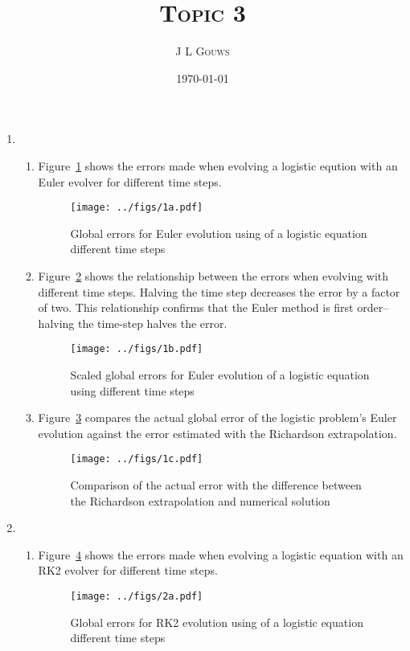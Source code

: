 \documentclass[12pt,a4]{article}
\title{
\textsc{Topic 3}
}
\author{\textsc{J L Gouws}
}
\date{\today
\\[1cm]}
\begin{document}
\thispagestyle{empty}

\maketitle

\begin{enumerate}
  \item
    \begin{enumerate}
      \item
        Figure~\ref{fig:1a} shows the errors made when evolving a logistic eqution with an Euler evolver for different time steps.
        \begin{figure}[H]
          \centering
          \texttt{[image: ../figs/1a.pdf]} 
          \caption{Global errors for Euler evolution using of a logistic equation different time steps}
          \label{fig:1a}
        \end{figure}

      \item
        Figure~\ref{fig:1b} shows the relationship between the errors when evolving with different time steps.
        Halving the time step decreases the error by a factor of two.
        This relationship confirms that the Euler method is first order--halving the time-step halves the error.

        \begin{figure}[H]
          \centering
          \texttt{[image: ../figs/1b.pdf]}
          \caption{Scaled global errors for Euler evolution of a logistic equation using different time steps}
          \label{fig:1b}
        \end{figure}

      \item
        Figure~\ref{fig:1c} compares the actual global error of the logistic problem's Euler evolution against the error estimated with the Richardson extrapolation.
        \begin{figure}[H]
          \centering
          \texttt{[image: ../figs/1c.pdf]}
          \caption{Comparison of the actual error with the difference between the Richardson extrapolation and numerical solution}
          \label{fig:1c}
        \end{figure}


    \end{enumerate}
  \item
    \begin{enumerate}
      \item
        Figure~\ref{fig:2a} shows the errors made when evolving a logistic equation with an RK2 evolver for different time steps.
        \begin{figure}[H]
          \centering
          \texttt{[image: ../figs/2a.pdf]}
          \caption{Global errors for RK2 evolution using of a logistic equation different time steps}
          \label{fig:2a}
        \end{figure}


\end{enumerate}
\end{enumerate}
\end{document}
